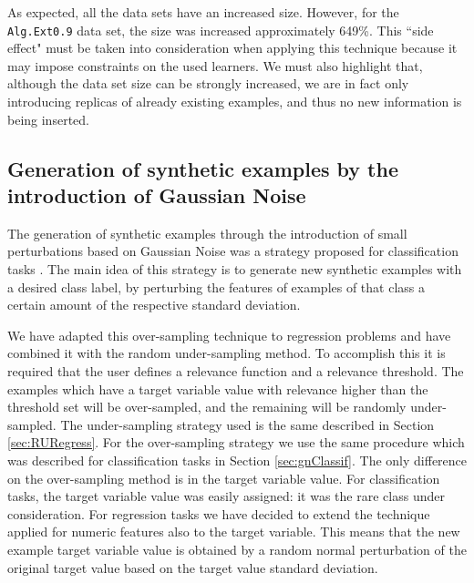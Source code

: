 \documentclass[10pt,a4paper]{article}\usepackage[]{graphicx}\usepackage[]{color}
\begin{document}
As expected, all the data sets have an increased size. However, for the \texttt{Alg.Ext0.9} data set, the size was increased approximately 649\%. This ``side effect" must be taken into consideration when applying this technique because it may impose constraints on the used learners. We must also highlight that, although the data set size can be strongly increased, we are in fact only introducing replicas of already existing examples, and thus no new information is being inserted.



\subsection{Generation of synthetic examples by the introduction of Gaussian Noise}\label{sec:gnRegress}

The generation of synthetic examples through the introduction of small perturbations based on Gaussian Noise was a strategy proposed for classification tasks \cite{lee1999regularization, lee2000noisy}. The main idea of this strategy is to generate new synthetic examples with a desired class label, by perturbing the features of examples of that class a certain amount of the respective standard deviation. 

We have adapted this over-sampling technique to regression problems and have combined it with the random under-sampling method. To accomplish this it is required that the user defines a relevance function and a relevance threshold. The examples which have a target variable value with relevance higher than the threshold set will be over-sampled, and the remaining will be randomly under-sampled. The under-sampling strategy used is the same described in Section \ref{sec:RURegress}. For the over-sampling strategy we use the same procedure which was described for classification tasks in Section \ref{sec:gnClassif}. The only difference on the over-sampling method is in the target variable value. For classification tasks, the target variable value was easily assigned: it was the rare class under consideration. For regression tasks we have decided to extend the technique applied for numeric features also to the target variable. This means that the new example target variable value is obtained by a random normal perturbation of the original target value based on the target value standard deviation.
\end{document}
